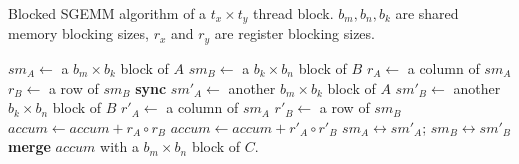 \begin{algorithm}
  \caption{Blocked SGEMM algorithm of a $t_x \times t_y$ thread block. $b_m, b_n, b_k$ are shared memory blocking sizes, $r_x$ and $r_y$ are register blocking sizes.}
  \label{gemm}
  {\footnotesize
  \begin{algorithmic}[1]
	\State $sm_A \gets$ a $b_m \times b_k$ block of $A$
	\State $sm_B \gets$ a $b_k \times b_n$ block of $B$
    \State $r_A \gets $ a column of $sm_A$%
    \State $r_B \gets $ a row of $sm_B$%
	\Do
	\State \textbf{sync}
	\State $sm'_A \gets$ another $b_m \times b_k$ block of $A$
	\State $sm'_B \gets$ another $b_k \times b_n$ block of $B$
		\State $r'_A \gets$ a column of $sm_A$ %
		\State $r'_B \gets$ a row of $sm_B$%
        \State $accum \gets accum + r_A \circ r_B$
        \Else
        \State $accum \gets accum + r'_A \circ r'_B$
        \EndIf
	\EndFor
      \State $sm_A \leftrightarrow sm'_A$; $sm_B \leftrightarrow sm'_B$ 
	\State \textbf{merge} $accum$ with a $b_m \times b_n$ block of $C$.
  \end{algorithmic}
  }
\end{algorithm}


